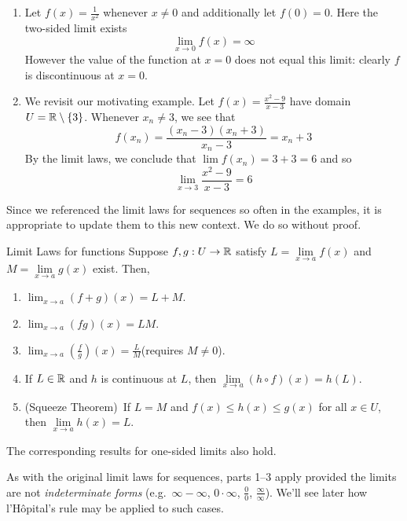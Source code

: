 \begin{examples}{}{}
\begin{enumerate}
	\item Let $f(x)=\frac 1{x^2}$ whenever $x\neq 0$ and additionally let $f(0)=0$. Here the two-sided limit exists
	\[
		\lim_{x\to 0}f(x)=\infty
	\]
	However the value of the function at $x=0$ does not equal this limit: clearly $f$ is discontinuous at $x=0$.
		
	\item We revisit our motivating example. Let $f(x)=\frac{x^2-9}{x-3}$ have domain $U=\mathbb{R}\setminus\{3\}$. Whenever $x_n\neq 3$, we see that
	\[
		f(x_n)=\frac{(x_n-3)(x_n+3)}{x_n-3}=x_n+3
	\]
	By the limit laws, we conclude that $\lim f(x_n)=3+3=6$ and so
	\[
		\lim\limits_{x\to 3}\frac{x^2-9}{x-3}=6
	\]
	\end{enumerate}
\end{examples}

\vfil
\goodbreak

Since we referenced the limit laws for sequences so often in the examples, it is appropriate to update them to this new context. We do so without proof.

\begin{cor}{Limit Laws for functions}{}
	Suppose $f,g:U\to\mathbb{R}$ satisfy $L=\lim\limits_{x\to a}f(x)$ and $M=\lim\limits_{x\to a}g(x)$ exist. Then,
	\begin{enumerate}
	  \item $\displaystyle\lim_{x\to a}(f+g)(x)=L+M$.
	  \item $\displaystyle\lim_{x\to a}(fg)(x)=LM$.
	  \item $\displaystyle\lim_{x\to a}\left(\frac fg\right)(x)=\frac LM$\quad (requires $M\neq 0$).
		\item If $L\in\mathbb{R}$ and $h$ is continuous at $L$, then $\displaystyle\lim\limits_{x\to a}(h\circ f)(x)=h(L)$.
		\item (Squeeze Theorem)\ If $L=M$ and $f(x)\le h(x)\le g(x)$ for all $x\in U$, then $\lim\limits_{x\to a}h(x)=L$.
	\end{enumerate}
	The corresponding results for one-sided limits also hold.
\end{cor}

As with the original limit laws for sequences, parts 1--3 apply provided the limits are not \emph{indeterminate forms} (e.g.\ $\infty-\infty$, $0\cdot\infty$, $\frac 00$, $\frac\infty\infty$). We'll see later how l'Hôpital's rule may be applied to such cases.


